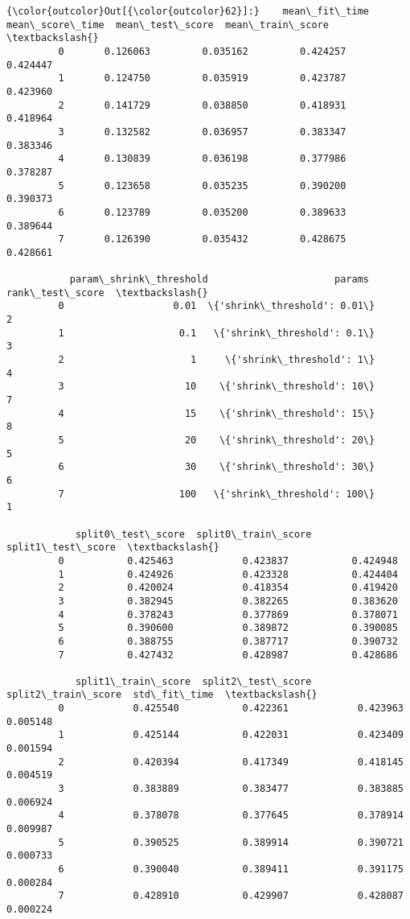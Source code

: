 \documentclass[11pt]{article}
\begin{document}
            \begin{Verbatim}[commandchars=\\\{\}]
{\color{outcolor}Out[{\color{outcolor}62}]:}    mean\_fit\_time  mean\_score\_time  mean\_test\_score  mean\_train\_score  \textbackslash{}
         0       0.126063         0.035162         0.424257          0.424447   
         1       0.124750         0.035919         0.423787          0.423960   
         2       0.141729         0.038850         0.418931          0.418964   
         3       0.132582         0.036957         0.383347          0.383346   
         4       0.130839         0.036198         0.377986          0.378287   
         5       0.123658         0.035235         0.390200          0.390373   
         6       0.123789         0.035200         0.389633          0.389644   
         7       0.126390         0.035432         0.428675          0.428661   
         
           param\_shrink\_threshold                      params  rank\_test\_score  \textbackslash{}
         0                   0.01  \{'shrink\_threshold': 0.01\}                2   
         1                    0.1   \{'shrink\_threshold': 0.1\}                3   
         2                      1     \{'shrink\_threshold': 1\}                4   
         3                     10    \{'shrink\_threshold': 10\}                7   
         4                     15    \{'shrink\_threshold': 15\}                8   
         5                     20    \{'shrink\_threshold': 20\}                5   
         6                     30    \{'shrink\_threshold': 30\}                6   
         7                    100   \{'shrink\_threshold': 100\}                1   
         
            split0\_test\_score  split0\_train\_score  split1\_test\_score  \textbackslash{}
         0           0.425463            0.423837           0.424948   
         1           0.424926            0.423328           0.424404   
         2           0.420024            0.418354           0.419420   
         3           0.382945            0.382265           0.383620   
         4           0.378243            0.377869           0.378071   
         5           0.390600            0.389872           0.390085   
         6           0.388755            0.387717           0.390732   
         7           0.427432            0.428987           0.428686   
         
            split1\_train\_score  split2\_test\_score  split2\_train\_score  std\_fit\_time  \textbackslash{}
         0            0.425540           0.422361            0.423963      0.005148   
         1            0.425144           0.422031            0.423409      0.001594   
         2            0.420394           0.417349            0.418145      0.004519   
         3            0.383889           0.383477            0.383885      0.006924   
         4            0.378078           0.377645            0.378914      0.009987   
         5            0.390525           0.389914            0.390721      0.000733   
         6            0.390040           0.389411            0.391175      0.000284   
         7            0.428910           0.429907            0.428087      0.000224   
         

\end{Verbatim}
\end{document}
